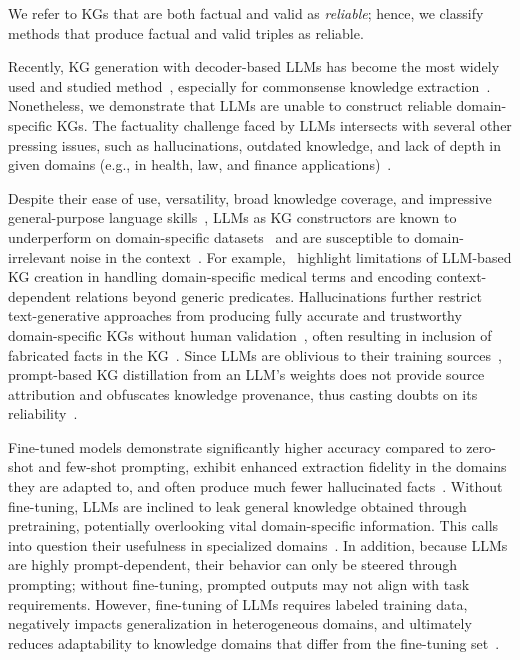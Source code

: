 \documentclass[10pt]{article}
\begin{document}
We refer to KGs that are both factual and valid as \emph{reliable}; hence, we classify methods that produce factual and valid triples as reliable.

Recently, KG generation with decoder-based LLMs has become the most widely used and studied method~\cite{xu2024llm-ie-survey}, especially for commonsense knowledge extraction~\cite{symbolic_kg_distillation}. Nonetheless, we demonstrate that LLMs are unable to construct reliable domain-specific KGs. The factuality challenge faced by LLMs intersects with several other pressing issues, such as hallucinations, outdated knowledge, and lack of depth in given domains (e.g., in health, law, and finance applications)~\cite{10.1145/3742420}.

Despite their ease of use, versatility, broad knowledge coverage, and impressive general-purpose language skills~\cite{2025largelanguagemodelssurvey}, LLMs as KG constructors are known to underperform on domain-specific datasets~\cite{LLM_for_kg_construction} and are susceptible to domain-irrelevant noise in the context~\cite{chen-etal-2024-sac}. For example,~\citet{Yang2025_llm_sepsis} highlight limitations of LLM-based KG creation in handling domain-specific medical terms and encoding context-dependent relations beyond generic predicates. Hallucinations further restrict text-generative approaches from producing fully accurate and trustworthy domain-specific KGs without human validation~\cite{Ghanem2025_ft_vs_prompt}, often resulting in inclusion of fabricated facts in the KG~\cite{huang2025llmsgoodgraphjudge}. Since LLMs are oblivious to their training sources~\cite{khalifa2024sourceaware}, prompt-based KG distillation from an LLM's weights does not provide source attribution and obfuscates knowledge provenance, thus casting doubts on its reliability~\cite {pan_et_al:TGDK}.

Fine-tuned models demonstrate significantly higher accuracy compared to zero-shot and few-shot prompting, exhibit enhanced extraction fidelity in the domains they are adapted to, and often produce much fewer hallucinated facts~\cite{Ghanem2025_ft_vs_prompt}. Without fine-tuning, LLMs are inclined to leak general knowledge obtained through pretraining, potentially overlooking vital domain-specific information. This calls into question their usefulness in specialized domains~\cite{yang-etal-2023-empower}. In addition, because LLMs are highly prompt-dependent, their behavior can only be steered through prompting; without fine-tuning, prompted outputs may not align with task requirements. However, fine-tuning of LLMs requires labeled training data, negatively impacts generalization in heterogeneous domains, and ultimately reduces adaptability to knowledge domains that differ from the fine-tuning set~\cite{Ghanem2025_ft_vs_prompt}.  
\end{document}
